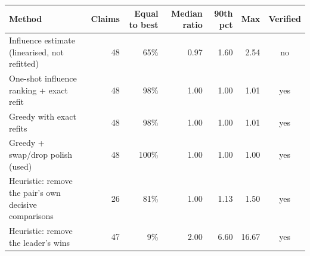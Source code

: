 \begin{tabular}{lrrrrrc}
\toprule
Method & Claims & Equal to best & Median ratio & 90th pct & Max & Verified \\
\midrule
Influence estimate (linearised, not refitted) & 48 & 65\% & 0.97 & 1.60 & 2.54 & no \\
One-shot influence ranking + exact refit & 48 & 98\% & 1.00 & 1.00 & 1.01 & yes \\
Greedy with exact refits & 48 & 98\% & 1.00 & 1.00 & 1.01 & yes \\
Greedy + swap/drop polish (used) & 48 & 100\% & 1.00 & 1.00 & 1.00 & yes \\
Heuristic: remove the pair's own decisive comparisons & 26 & 81\% & 1.00 & 1.13 & 1.50 & yes \\
Heuristic: remove the leader's wins & 47 & 9\% & 2.00 & 6.60 & 16.67 & yes \\
\bottomrule
\end{tabular}
